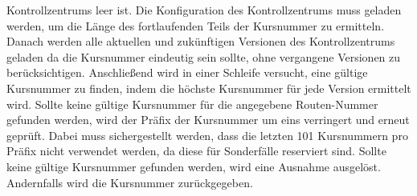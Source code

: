     Kontrollzentrums leer ist.
    Die Konfiguration des Kontrollzentrums muss geladen werden, um die Länge des fortlaufenden Teils der Kursnummer zu ermitteln.
    Danach werden alle aktuellen und zukünftigen Versionen des Kontrollzentrums geladen da die Kursnummer eindeutig sein sollte, ohne vergangene Versionen zu berücksichtigen.
    Anschließend wird in einer Schleife versucht, eine gültige Kursnummer zu finden, indem die höchste Kursnummer für jede Version ermittelt wird. Sollte 
    keine gültige Kursnummer für die angegebene Routen-Nummer gefunden werden, wird der Präfix der Kursnummer um eins verringert und erneut geprüft. Dabei muss sichergestellt werden, dass 
    die letzten 101 Kursnummern pro Präfix nicht verwendet werden, da diese für Sonderfälle reserviert sind.
    Sollte keine gültige Kursnummer gefunden werden,
    wird eine Ausnahme ausgelöst. Andernfalls wird die Kursnummer zurückgegeben.
